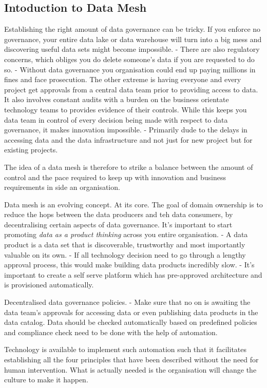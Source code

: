 \documentclass[a4paper, 11pt]{article}
\begin{document}
    \subsection{Intoduction to Data Mesh}
    Establishing the right amount of data governance can be tricky.
    If you enforce no governance, your entire data lake or data warehouse will turn into a big mess and discovering useful data sets might become impossible.
    - There are also regulatory concerns, which obliges you do delete someone's data if you are requested to do so.
    - Without data governance you organisation could end up paying millions in fines and face prosecution.
    The other extreme is having everyone and every project get approvals from a central data team prior to providing access to data.
    It also involves constant audits with a burden on the business orientate technology teams to provides evidence of their controls.
    While this keeps you data team in control of every decision being made with respect to data governance, it makes innovation impossible.
    - Primarily dude to the delays in accessing data and the data infrastructure and not just for new project but for existing projects.

    The idea of a data mesh is therefore to strike a balance between the amount of control and the pace required to keep up with innovation and business requirements in side an organisation.

    Data mesh is an evolving concept.
    At its core.
    The goal of domain ownership is to reduce the hops between the data producers and teh data consumers, by decentralising certain aspects of data governance.
    It's important to start promoting \textit{data as a product thinking} across you entire organisation.
    - A data product is a data set that is discoverable, trustworthy and most importantly valuable on its own.
    - If all technology decision need to go through a lengthy approval process, this would make building data products incredibly slow.
    - It's important to create a self serve platform which has pre-approved architecture and is provisioned automatically.

    Decentralised data governance policies.
    - Make sure that no on is awaiting the data team's approvals for accessing data or even publishing data products in the data catalog.
    Data should be checked automatically based on predefined policies and compliance check need to be done with the help of automation.

    Technology is available to implement such automation such that it facilitates establishing all the four principles that have been described without the need for human intervention.
    What is actually needed is the organisation will change the culture to make it happen.
\end{document}
